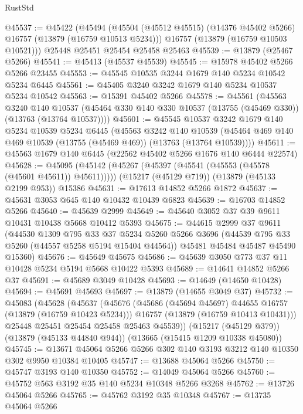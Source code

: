 \begin{lexlean}{RustStd}
\begin{coremodule}
@45537 := @45422
    (@45494
      (@45504 (@45512 @45515) (@14376 @45402 @5266) @16757 (@13879 (@16759 @10513 @5234)))
      @16757
      (@13879 (@16759 @10503 @10521)))
    @25448
    @25451
    @25454
    @25458
    @25463
@45539 := @13879 (@25467 @5266)
@45541 := @45413 (@45537 @45539)
@45545 := @15978 @45402 @5266 @5266 @23455
@45553 := @45545 @10535 @3244 @1679 @140 @5234 @10542 @5234 @6445
@45561 := @45405 @3240 @3242 @1679 @140 @5234 @10537 @5234 @10542
@45563 := @15391 @45402 @5266
@45578 := @45561
    (@45563
      @3240
      @140
      @10537
      (@45464 @330 @140 @330 @10537 (@13755 (@45469 @330)) (@13763 (@13764 @10537))))
@45601 := @45545
    @10537
    @3242
    @1679
    @140
    @5234
    @10539
    @5234
    @6445
    (@45563
      @3242
      @140
      @10539
      (@45464 @469 @140 @469 @10539 (@13755 (@45469 @469)) (@13763 (@13764 @10539))))
@45611 := @45563 @1679 @140 @6445 (@22562 @45402 @5266 @1676 @140 @6444 @22574)
@45628 := @45095
    (@45142 (@45267 (@45397 (@45541 (@45553 (@45578 (@45601 @45611)) @45611)))))
    (@15217 (@45129 @719))
    (@13879 (@45133 @2199 @953))
    @15386
@45631 := @17613 @14852 @5266 @1872
@45637 := @45631 @3053 @645 @140 @10432 @10439 @6823
@45639 := @16703 @14852 @5266
@45640 := @45639 @2999
@45649 := @45640 @3052 @37 @39 @9611 @10431 @10438 @5668 @10412 @5393
@45675 := @44615
    @2999
    @37
    @9611
    (@44530
      @1309
      @795
      @33
      @37
      @5234
      @5260
      @5266
      @3696
      (@44539 @795 @33 @5260 (@44557 @5258 @5194 @15404 @44564))
      @45481
      @45484
      @45487
      @45490
      @15360)
@45676 := @45649 @45675
@45686 := @45639 @3050 @773 @37 @11 @10428 @5234 @5194 @5668 @10422 @5393
@45689 := @14641 @14852 @5266 @37
@45691 := @45689 @3049 @10428
@45693 := @14649 (@14650 @10428)
@45694 := @45691 @45693
@45697 := @13879 (@14655 @3049 @37)
@45732 := @45083
    (@45628
      (@45637
        (@45676
          (@45686 (@45694 @45697) @44655 @16757 (@13879 (@16759 @10423 @5234)))
          @16757
          (@13879 (@16759 @10413 @10431)))
        @25448
        @25451
        @25454
        @25458
        @25463
        @45539))
    (@15217 (@45129 @379))
    (@13879 (@45133 @44840 @944))
    (@13665 (@15415 @1209 @10338 @45080))
@45745 := @13671 @45064 @5266 @5266 @302 @140 @3193 @3212 @140 @10350 @302 @9950 @10384 @10405
@45747 := @13688 @45064 @5266
@45750 := @45747 @3193 @140 @10350
@45752 := @14049 @45064 @5266
@45760 := @45752 @563 @3192 @35 @140 @5234 @10348 @5266 @3268
@45762 := @13726 @45064 @5266
@45765 := @45762 @3192 @35 @10348
@45767 := @13735 @45064 @5266

\end{coremodule}
\end{lexlean}
